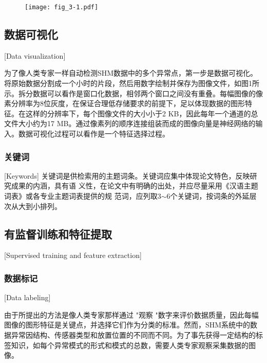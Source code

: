 \begin{figure}[!h]
\centering\texttt{[image: fig\_3-1.pdf]}
\vspace{0.2em}
\end{figure}

\subsection{数据可视化}[Data visualization]

为了像人类专家一样自动检测SHM数据中的多个异常点，第一步是数据可视化。将原始数据分割成一个小时的片段，然后用数字绘制并保存为图像文件，如图1所示。拆分数据可以看作是窗口化数据，相邻两个窗口之间没有重叠。每幅图像的像素分辨率为8位灰度，在保证合理低存储要求的前提下，足以体现数据的图形特征。在这样的分辨率下，每个图像文件的大小小于2 KB，因此每年一个通道的总文件大小约为17 MB。通过像素列的顺序连接组装而成的图像向量是神经网络的输入。数据可视化过程可以看作是一个特征选择过程。

\subsubsection{关键词}[Keywords]
关键词是供检索用的主题词条。关键词应集中体现论文特色，反映研究成果的内涵，具有语
义性，在论文中有明确的出处，并应尽量采用《汉语主题词表》或各专业主题词表提供的规
范词，应列取3$\sim$6个关键词，按词条的外延层次从大到小排列。

\subsection{有监督训练和特征提取}[Supervised training and feature extraction]
\subsubsection{数据标记}[Data labeling]

由于所提出的方法是像人类专家那样通过 "观察 "数字来评价数据质量，因此每幅图像的图形特征是关键点，并选择它们作为分类的标准。然而，SHM系统中的数据异常因结构、传感器类型和放置位置的不同而不同。为了事先获得一定结构的标签知识，如每个异常模式的形式和模式的总数，需要人类专家观察采集数据的图像。

